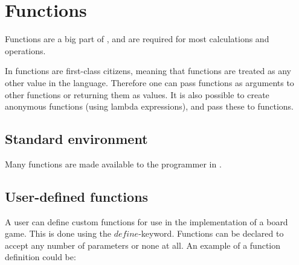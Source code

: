 \section{Functions}

Functions are a big part of \productname, and are required for most calculations and operations.

In \productname functions are first-class citizens, meaning that functions are treated
as any other value in the language. Therefore one can pass functions as
arguments to other functions or returning them as values. It is also possible to create
anonymous functions (using lambda expressions), and pass these to functions.

\subsection{Standard environment}

Many functions are made available to the programmer in \productname.

\subsection{User-defined functions}

A user can define custom functions for use in the implementation of a board game.
This is done using the $define$-keyword. Functions can be declared to accept
any number of parameters or none at all. An example of a function definition could
be:


